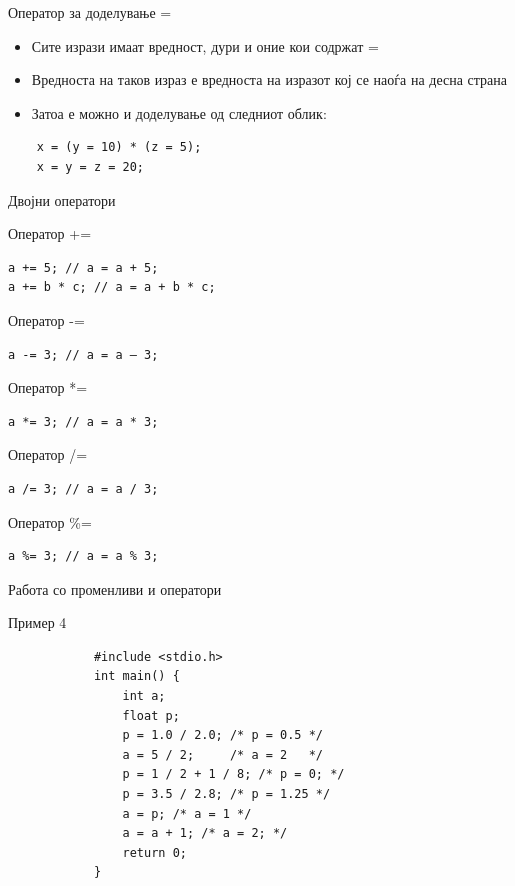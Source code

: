 \begin{frame}[fragile]{Оператор за доделување =}
\begin{itemize}
\item Сите изрази имаат вредност, дури и оние кои содржат =
\item Вредноста на таков израз е вредноста на изразот кој се наоѓа на десна страна
\item Затоа е можно и доделување од следниот облик:
\end{itemize}
\begin{verbatim}
    x = (y = 10) * (z = 5);
    x = y = z = 20;
\end{verbatim}
\end{frame}	

\begin{frame}[fragile,shrink=5]{Двојни оператори}
\begin{block}{Оператор +=}
\begin{verbatim}
a += 5; // a = a + 5;
a += b * c; // a = a + b * c;
\end{verbatim}
\end{block}
\begin{block}{Оператор -=}
\begin{verbatim}
a -= 3; // a = a – 3;
\end{verbatim}
\end{block}
\begin{block}{Оператор *=}
\begin{verbatim}
a *= 3; // a = a * 3;
\end{verbatim}
\end{block}
\begin{block}{Оператор /=}
\begin{verbatim}
a /= 3; // a = a / 3;
\end{verbatim}
\end{block}
\begin{block}{Оператор \%=}
\begin{verbatim}
a %= 3; // a = a % 3;
\end{verbatim}
\end{block}
\end{frame}	

\begin{frame}[fragile]{Работа со променливи и оператори}
	\begin{exampleblock}{Пример 4}
		\begin{lstlisting}
			#include <stdio.h>	
			int main() {
			    int a;
			    float p;
			    p = 1.0 / 2.0; /* p = 0.5 */
			    a = 5 / 2;     /* a = 2   */
			    p = 1 / 2 + 1 / 8; /* p = 0; */
			    p = 3.5 / 2.8; /* p = 1.25 */
			    a = p; /* a = 1 */
			    a = a + 1; /* a = 2; */
			    return 0;		
			}
		\end{lstlisting}
	\end{exampleblock}
\end{frame}

